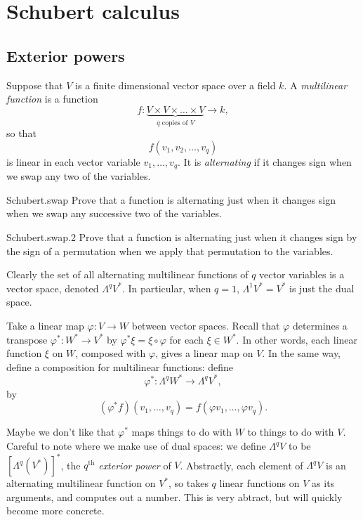 \chapter{Schubert calculus}
\section{Exterior powers}
Suppose that \(V\) is a finite dimensional vector space over a field \(k\).
A \emph{multilinear function} is a function 
\[
f \colon \underbrace{V \times V \times \dots \times V}_{q \text{ copies of } V} \to k,
\]
so that 
\[
f(v_1,v_2,\dots,v_q)
\]
is linear in each vector variable \(v_1,\dots,v_q\).
It is \emph{alternating} if it changes sign when we swap any two of the variables.
\begin{problem}{Schubert.swap}
Prove that a function is alternating just when it changes sign when we swap any successive two of the variables.
\end{problem}
\begin{problem}{Schubert.swap.2}
Prove that a function is alternating just when it changes sign by the sign of a permutation when we apply that permutation to the variables.
\end{problem}
Clearly the set of all alternating multilinear functions of \(q\) vector variables is a vector space, denoted \(\Lambda^q V^*\).
In particular, when \(q=1\), \(\Lambda^1V^*=V^*\) is just the dual space.

Take a linear map \(\varphi \colon V \to W\) between vector spaces.
Recall that \(\varphi\) determines a transpose \(\varphi^* \colon W^* \to V^*\) by \(\varphi^* \xi=\xi \circ \varphi\) for each \(\xi \in W^*\).
In other words, each linear function \(\xi\) on \(W\), composed with \(\varphi\), gives a linear map on \(V\).
In the same way, define a composition for multilinear functions: define
\[
\varphi^* \colon \Lambda^q W^* \to \Lambda^q V^*,
\]
by
\[
(\varphi^*f)(v_1,\dots,v_q)=f(\varphi v_1,\dots, \varphi v_q).
\]

Maybe we don't like that \(\varphi^*\) maps things to do with \(W\) to things to do with \(V\).
Careful to note where we make use of dual spaces: we define \(\Lambda^q V\) to be \([\Lambda^q (V^*)]^*\), the \(q^{\text{th}}\) \emph{exterior power} of \(V\).
Abstractly, each element of \(\Lambda^q V\) is an alternating multilinear function on \(V^*\), so takes \(q\) linear functions on \(V\) as its arguments, and computes out a number.
This is very abtract, but will quickly become more concrete.

